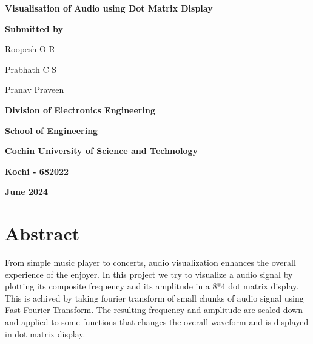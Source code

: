 \documentclass[12pt, a4paper]{article}
\begin{document}
\begin{titlepage}
	\centering
	{\Huge\bfseries Visualisation of Audio using Dot Matrix Display \par}
	\vspace{1.7cm}
	{\Large \textbf{Submitted by} \par}
	\vspace{1cm}
	{\large Roopesh O R\par}
	{\large Prabhath C S\par}
	{\large Pranav Praveen\par}
	\vspace{2cm}

	\par
	\vspace{.3cm}
	{\large \bfseries Division of Electronics Engineering \par}
	{\large \bfseries School of Engineering \par}
	{\large \bfseries Cochin University of Science and Technology \par}
	{\large \bfseries Kochi - 682022 \par}
	\vspace{.5cm}
	{\large \bfseries June 2024 \par}

	\vfill

\end{titlepage}


\newcommand{\usection}[1]{
	\section*{\center \Huge #1}
	\addcontentsline{toc}{section}{\protect\numberline{}#1}
}
\newcommand{\usubsection}[1]{
	\section*{\LARGE #1}
	\addcontentsline{toc}{subsection}{\protect\numberline{}#1}
}

\vspace*{2cm}
\usection{Abstract}
\vspace{.5cm}
From simple music player to concerts, audio visualization
enhances the overall experience of the enjoyer. In this
project we try to visualize a audio signal by plotting
its composite frequency and its amplitude in a 8*4 dot matrix display.
This is achived by taking fourier transform of small chunks of 
audio signal using Fast Fourier Transform. The resulting frequency and
amplitude are scaled down and applied to some functions that changes the overall waveform and is displayed in dot matrix display.
\end{document}
